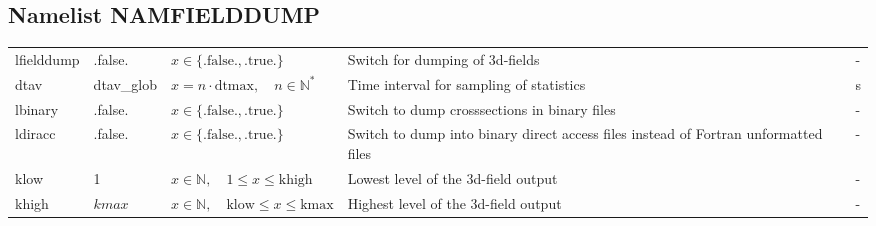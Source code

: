 \documentclass[twoside,11pt,fleqn,a4paper,english,openright]{report}
\begin{document}
\newpage
\subsection{Namelist NAMFIELDDUMP}\label{par:fielddump}

\begin{center}
  \tablelasttail{
        &&&&\\\hline
  }
\begin{supertabular}{|l|p{1.6cm}|p{4.8cm}|p{6cm}|l|}
  lfielddump	& .false.	& $x\in\{\text{.false.},\text{.true.}\}$	& Switch for dumping of 3d-fields		& -\\
  dtav		& dtav\_glob	& $x = n \cdot \text{dtmax}, \quad n \in \mathbb{N}^*$	& Time interval for sampling of statistics	& s\\
  lbinary	& .false.	& $x\in\{\text{.false.},\text{.true.}\}$	& Switch to dump crosssections in binary files	& -\\  
  ldiracc	& .false.	& $x\in\{\text{.false.},\text{.true.}\}$	& Switch to dump into binary direct access files instead of Fortran unformatted files		& -\\
  klow		& 1		& $x \in \mathbb{N}, \quad 1 \le x \le \text{khigh}$	& Lowest level of the 3d-field output		& -\\
  khigh		& $kmax$	& $x \in \mathbb{N}, \quad \text{klow} \le x \le \text{kmax}$	& Highest level of the 3d-field output		& -\\
\end{supertabular}
\end{center}
\end{document}
